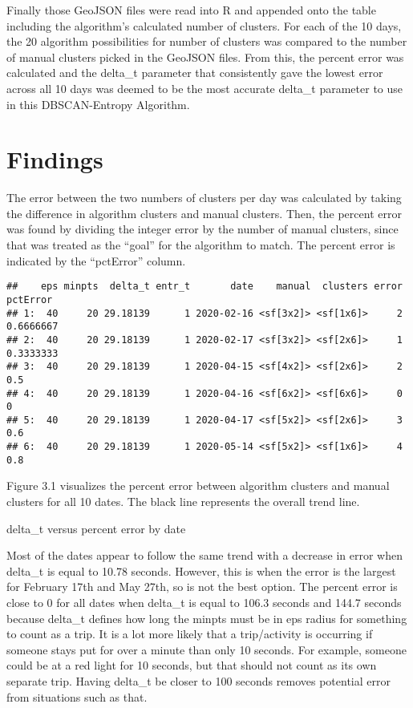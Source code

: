 \documentclass[3p, authoryear]{elsarticle} %
\begin{document}
Finally those GeoJSON files were read into R and appended onto the table including the algorithm's calculated number of clusters. For each of the 10 days, the 20 algorithm possibilities for number of clusters was compared to the number of manual clusters picked in the GeoJSON files. From this, the percent error was calculated and the delta\_t parameter that consistently gave the lowest error across all 10 days was deemed to be the most accurate delta\_t parameter to use in this DBSCAN-Entropy Algorithm.

\hypertarget{findings}{%
\section{Findings}\label{findings}}

The error between the two numbers of clusters per day was calculated by taking the
difference in algorithm clusters and manual clusters. Then, the percent error was
found by dividing the integer error by the number of manual clusters, since
that was treated as the ``goal'' for the algorithm to match. The percent error is
indicated by the ``pctError'' column.

\begin{verbatim}
##    eps minpts  delta_t entr_t       date    manual  clusters error  pctError
## 1:  40     20 29.18139      1 2020-02-16 <sf[3x2]> <sf[1x6]>     2 0.6666667
## 2:  40     20 29.18139      1 2020-02-17 <sf[3x2]> <sf[2x6]>     1 0.3333333
## 3:  40     20 29.18139      1 2020-04-15 <sf[4x2]> <sf[2x6]>     2       0.5
## 4:  40     20 29.18139      1 2020-04-16 <sf[6x2]> <sf[6x6]>     0         0
## 5:  40     20 29.18139      1 2020-04-17 <sf[5x2]> <sf[2x6]>     3       0.6
## 6:  40     20 29.18139      1 2020-05-14 <sf[5x2]> <sf[1x6]>     4       0.8
\end{verbatim}

Figure 3.1 visualizes the percent error between algorithm clusters and manual clusters
for all 10 dates. The black line represents the overall trend line.

\label{fig:showErrorPlot}delta\_t versus percent error by date

Most of the dates appear to follow the same trend with a decrease in error when delta\_t
is equal to 10.78 seconds. However, this is when the error is the largest for February 17th and
May 27th, so is not the best option. The percent error is close to 0 for all dates when delta\_t
is equal to 106.3 seconds and 144.7 seconds because delta\_t defines how long the minpts must
be in eps radius for something to count as a trip. It is a lot more likely that a trip/activity
is occurring if someone stays put for over a minute than only 10 seconds. For example,
someone could be at a red light for 10 seconds, but that should not count as its own separate trip.
Having delta\_t be closer to 100 seconds removes potential error from situations such as that.
\end{document}
